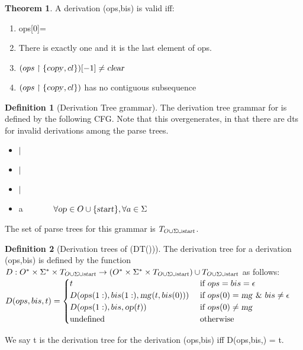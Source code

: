 \documentclass[12pt]{article}
\theoremstyle{definition}
\newtheorem{definition}{Definition}[section]
\newtheorem{thm}{Theorem}[section]
\begin{document}
\begin{thm}
  A derivation (ops,bis) is valid iff:

  \begin{enumerate}
  \item ops[0]=\mg
  \item There is exactly one \ed and it is the last element of ops.
  \item $(ops\restriction \{\text{\textsl{copy}},cl\})[-1]\neq\text{\textsl{clear}}$
  \item $(ops\restriction \{\text{\textsl{copy}},cl\})$ has no contiguous subsequence \cl \cl
\end{enumerate}

\label{thm:valid-properties}
\end{thm}



\begin{definition}[Derivation Tree grammar]
  The derivation tree grammar for \OURG is defined by the following CFG. Note that this overgenerates, in that there are dts for invalid derivations among the parse trees.
  \begin{itemize}
  \item \cp \arr \cp $|$ \mg
  \item \cl \arr \cp $|$ \mg
  \item \ed \arr \cp $|$ \mg
  \item \mg \arr \op a ~~~~~~ $\forall \text{\textsl{op}}\in O\cup\{\text{\textsl{start}}\}, \forall a\in\Sigma$
  \end{itemize}

  The set of parse trees for this grammar is $T_{O\cup\Sigma\cup\text{\textsl{start}}}$.
  
\end{definition}


\begin{definition}[Derivation trees of \OURG (DT(\OURG))]
  The derivation tree for a derivation (ops,bis) is defined by the function $D:O^* \times \Sigma^* \times T_{O\cup\Sigma\cup\text{\textsl{start}}} \rightarrow (O^* \times \Sigma^* \times T_{O\cup\Sigma\cup\text{\textsl{start}}}) \cup T_{O\cup\Sigma\cup\text{\textsl{start}}}$ as follows:\\

  $D(ops,bis,t)=  
  \begin{cases}
    t & \text{ if } ops=bis=\epsilon\\
    D(ops(1:),bis(1:),\text{\textsl{mg}}(t,bis(0))) & \text{ if } ops(0)=\text{\textsl{mg}} ~\&~ bis\neq\epsilon\\
    D(ops(1:),bis,\text{\textsl{op}}(t)) & \text{ if } ops(0)\neq\text{\textsl{mg}}\\
    \text{undefined} & \text{ otherwise}
  \end{cases}
  $
  
  We say t is the derivation tree for the derivation (ops,bis) iff D(ops,bis,\start) = t.
\end{definition}
\end{document}
